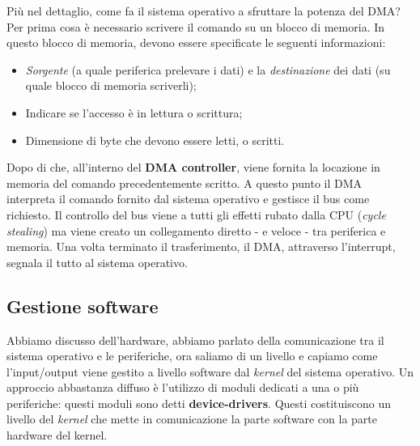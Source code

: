 Più nel dettaglio, come fa il sistema operativo a sfruttare la potenza del DMA? Per prima cosa è necessario scrivere il comando su un blocco di memoria. In questo blocco di memoria, devono essere specificate le seguenti informazioni:
\vspace{-5px}
\begin{itemize}
\setlength{\itemsep}{-.15 em}
    \item \textit{Sorgente} (a quale periferica prelevare i dati) e la \textit{destinazione} dei dati (su quale blocco di memoria scriverli);
    \item Indicare se l'accesso è in lettura o scrittura;
    \item Dimensione di byte che devono essere letti, o scritti.
\end{itemize}
Dopo di che, all'interno del \textbf{DMA controller}, viene fornita la locazione in memoria del comando precedentemente scritto. A questo punto il DMA interpreta il comando fornito dal sistema operativo e gestisce il bus come richiesto. Il controllo del bus viene a tutti gli effetti rubato dalla CPU (\textit{cycle stealing}) ma viene creato un collegamento diretto - e veloce - tra periferica e memoria. Una volta terminato il trasferimento, il DMA, attraverso l'interrupt, segnala il tutto al sistema operativo.

% 
\subsection{Gestione software}\label{device-drivers}
Abbiamo discusso dell'hardware, abbiamo parlato della comunicazione tra il sistema operativo e le periferiche, ora saliamo di un livello e capiamo come l'input/output viene gestito a livello software dal \textit{kernel} del sistema operativo. Un approccio abbastanza diffuso è l'utilizzo di moduli dedicati a una o più periferiche: questi moduli sono detti \textbf{device-drivers}. Questi costituiscono un livello del \textit{kernel} che mette in comunicazione la parte software con la parte hardware del kernel. 

